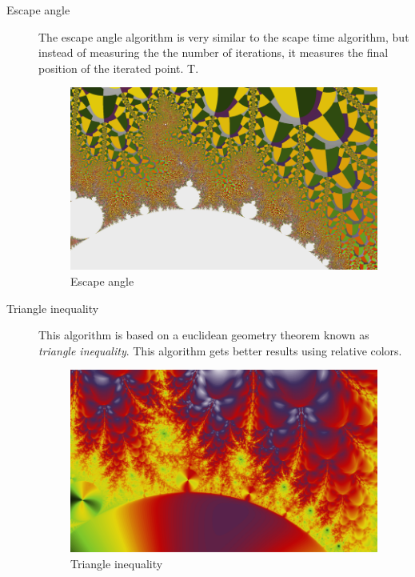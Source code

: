 \documentclass[oneside]{book}
\begin{document}
\begin{description}
\item[Escape angle] The escape angle algorithm is very similar to the scape time algorithm, but instead of measuring the the number of iterations, it measures the final position of the iterated point. T.

\begin{figure}[h!]
	\centering
	\includegraphics[scale=0.3]{img/fractal5.png}
	\caption{Escape angle}
	\label{escapeAngle}
\end{figure}

\item[Triangle inequality] This algorithm is based on a euclidean geometry theorem known as \textit{triangle inequality}. This algorithm gets better results using relative colors.

\begin{figure}[h!]
	\centering
	\includegraphics[scale=0.3]{img/fractal1.png}
	\caption{Triangle inequality}
	\label{Triangle}
\end{figure}

\end{description}
\end{document}
